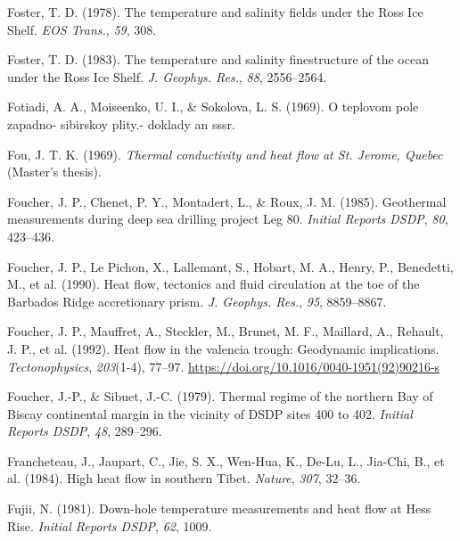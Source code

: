 \begin{CSLReferences}{1}{1}
\leavevmode{}%
Foster, T. D. (1978). The temperature and salinity fields under the {Ross Ice Shelf}. \emph{EOS Trans.}, \emph{59}, 308.

\leavevmode{}%
Foster, T. D. (1983). The temperature and salinity finestructure of the ocean under the {Ross Ice Shelf}. \emph{J. Geophys. Res.}, \emph{88}, 2556--2564.

\leavevmode{}%
Fotiadi, A. A., Moiseenko, U. I., \& Sokolova, L. S. (1969). O teplovom pole zapadno- sibirskoy plity.- doklady an sssr.

\leavevmode{}%
Fou, J. T. K. (1969). \emph{Thermal conductivity and heat flow at {St. Jerome, Quebec}} (Master's thesis).

\leavevmode{}%
Foucher, J. P., Chenet, P. Y., Montadert, L., \& Roux, J. M. (1985). Geothermal measurements during deep sea drilling project {Leg 80}. \emph{Initial Reports DSDP}, \emph{80}, 423--436.

\leavevmode{}%
Foucher, J. P., Le Pichon, X., Lallemant, S., Hobart, M. A., Henry, P., Benedetti, M., et al. (1990). Heat flow, tectonics and fluid circulation at the toe of the {Barbados Ridge} accretionary prism. \emph{J. Geophys. Res.}, \emph{95}, 8859--8867.

\leavevmode{}%
Foucher, J. P., Mauffret, A., Steckler, M., Brunet, M. F., Maillard, A., Rehault, J. P., et al. (1992). Heat flow in the valencia trough: Geodynamic implications. \emph{Tectonophysics}, \emph{203}(1-4), 77--97. \url{https://doi.org/10.1016/0040-1951(92)90216-s}

\leavevmode{}%
Foucher, J.-P., \& Sibuet, J.-C. (1979). Thermal regime of the northern {Bay of Biscay} continental margin in the vicinity of DSDP sites 400 to 402. \emph{Initial Reports DSDP}, \emph{48}, 289--296.

\leavevmode{}%
Francheteau, J., Jaupart, C., Jie, S. X., Wen-Hua, K., De-Lu, L., Jia-Chi, B., et al. (1984). High heat flow in southern {Tibet}. \emph{Nature}, \emph{307}, 32--36.

\leavevmode{}%
Fujii, N. (1981). Down-hole temperature measurements and heat flow at {Hess Rise}. \emph{Initial Reports DSDP}, \emph{62}, 1009.


\end{CSLReferences}
